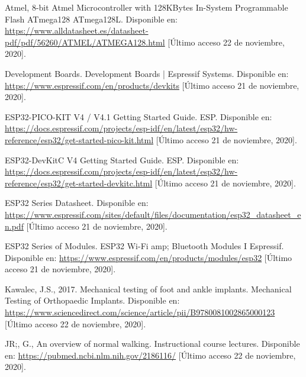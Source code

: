 \begin{thebibliography}{99}
 Atmel, 8-bit Atmel Microcontroller with 128KBytes In-System Programmable Flash ATmega128 ATmega128L. Disponible en: \url{https://www.alldatasheet.es/datasheet-pdf/pdf/56260/ATMEL/ATMEGA128.html} [Último acceso 22 de noviembre, 2020].


 Development Boards. Development Boards | Espressif Systems. Disponible en: \url{https://www.espressif.com/en/products/devkits} [Último acceso 21 de noviembre, 2020].

 ESP32-PICO-KIT V4 / V4.1 Getting Started Guide. ESP. Disponible en: \url{https://docs.espressif.com/projects/esp-idf/en/latest/esp32/hw-reference/esp32/get-started-pico-kit.html} [Último acceso 21 de noviembre, 2020].

 ESP32-DevKitC V4 Getting Started Guide. ESP. Disponible en: \url{https://docs.espressif.com/projects/esp-idf/en/latest/esp32/hw-reference/esp32/get-started-devkitc.html} [Último acceso 21 de noviembre, 2020].

 ESP32 Series Datasheet. Disponible en: \url{https://www.espressif.com/sites/default/files/documentation/esp32_datasheet_en.pdf} [Último acceso 21 de noviembre, 2020].

 ESP32 Series of Modules. ESP32 Wi-Fi amp; Bluetooth Modules I Espressif. Disponible en: \url{https://www.espressif.com/en/products/modules/esp32} [Último acceso 21 de noviembre, 2020].

 Kawalec, J.S., 2017. Mechanical testing of foot and ankle implants. Mechanical Testing of Orthopaedic Implants. Disponible en: \url{https://www.sciencedirect.com/science/article/pii/B9780081002865000123} [Último acceso 22 de noviembre, 2020].

 JR;, G., An overview of normal walking. Instructional course lectures. Disponible en: \url{https://pubmed.ncbi.nlm.nih.gov/2186116/} [Último acceso 22 de noviembre, 2020].

\end{thebibliography}
